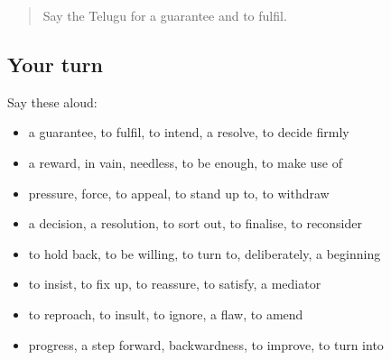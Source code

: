 \label{lesson:TE-R429-review-422-429}



\begin{quote}
Say the Telugu for a guarantee and to fulfil.
\end{quote}

\subsection*{Your turn}
Say these aloud:

\begin{itemize}
\raggedright
  \item a guarantee, to fulfil, to intend, a resolve, to decide firmly
  \item a reward, in vain, needless, to be enough, to make use of
  \item pressure, force, to appeal, to stand up to, to withdraw
  \item a decision, a resolution, to sort out, to finalise, to reconsider
  \item to hold back, to be willing, to turn to, deliberately, a beginning
  \item to insist, to fix up, to reassure, to satisfy, a mediator
  \item to reproach, to insult, to ignore, a flaw, to amend
  \item progress, a step forward, backwardness, to improve, to turn into
\end{itemize}


